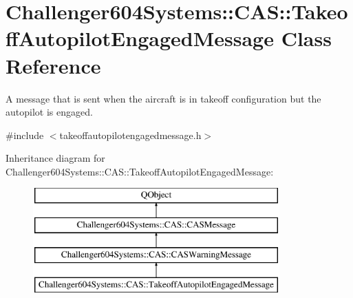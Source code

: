 \hypertarget{class_challenger604_systems_1_1_c_a_s_1_1_takeoff_autopilot_engaged_message}{\section{Challenger604\-Systems\-:\-:C\-A\-S\-:\-:Takeoff\-Autopilot\-Engaged\-Message Class Reference}
\label{class_challenger604_systems_1_1_c_a_s_1_1_takeoff_autopilot_engaged_message}
}


A message that is sent when the aircraft is in takeoff configuration but the autopilot is engaged.  




{\ttfamily \#include $<$takeoffautopilotengagedmessage.\-h$>$}

Inheritance diagram for Challenger604\-Systems\-:\-:C\-A\-S\-:\-:Takeoff\-Autopilot\-Engaged\-Message\-:\begin{figure}[H]
\begin{center}
\leavevmode
\includegraphics[height=4.000000cm]{class_challenger604_systems_1_1_c_a_s_1_1_takeoff_autopilot_engaged_message}
\end{center}
\end{figure}
